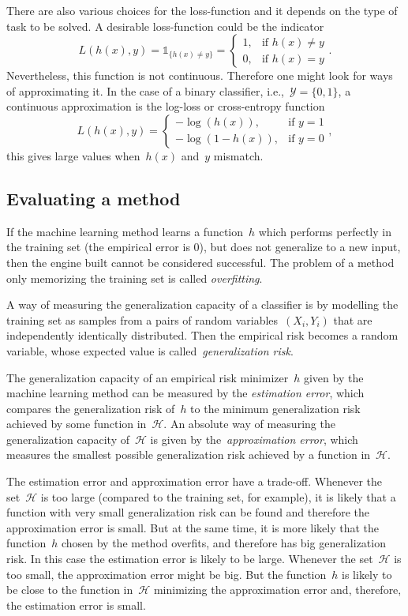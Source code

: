 There are also various choices for the loss-function and it depends on the type of task to be solved. A desirable loss-function could be the indicator
\[
L(h(x), y) = \mathds{1}_{\{h(x) \neq y\}} = \left\{ \begin{array}{lr}
1, & \text{if } h(x) \neq y\\
0, & \text{if } h(x) = y
\end{array} \right. .
\]
Nevertheless, this function is not continuous. Therefore one might look for ways of approximating it. In the case of a binary classifier, i.e.,~$\mathcal{Y} = \{0, 1\}$, a continuous approximation is the log-loss or cross-entropy function
\[
L(h(x), y) = \left\{ 
\begin{array}{lr}
-\log (h(x)), & \text{if } y = 1\\
-\log (1 - h(x)), & \text{if } y = 0
\end{array} \right. ,
\]
this gives large values when~$h(x)$ and~$y$ mismatch.


\subsection{Evaluating a method}

If the machine learning method learns a function~$h$ which performs perfectly in the training set (the empirical error is $0$), but does not generalize to a new input, then the engine built cannot be considered successful. The problem of a method only memorizing the training set is called \textit{overfitting}. 

A way of measuring the generalization capacity of a classifier is by modelling the training set as samples from a pairs of random variables~$(X_i, Y_i)$ that are independently identically  distributed. Then the empirical risk becomes a random variable, whose expected value is called~\textit{generalization risk}. 

The generalization capacity of an empirical risk minimizer~$h$ given by the machine learning method can be measured by the \textit{estimation error}, which compares the generalization risk of~$h$ to the minimum generalization risk achieved by some function in~$\mathcal{H}$. An absolute way of measuring the generalization capacity of~$\mathcal{H}$ is given by the~\textit{approximation error}, which measures the smallest possible generalization risk achieved by a function in~$\mathcal{H}$.

The estimation error and approximation error have a trade-off. Whenever the set~$\mathcal{H}$ is too large (compared to the training set, for example), it is likely that a function with very small generalization risk can be found and therefore the approximation error is small. But at the same time, it is more likely that the function~$h$ chosen by the method overfits, and therefore has big generalization risk. In this case the estimation error is likely to be large. Whenever the set~$\mathcal{H}$ is too small, the approximation error might be big. But the function~$h$ is likely to be close to the function in~$\mathcal{H}$ minimizing the approximation error and, therefore, the estimation error is small.  

